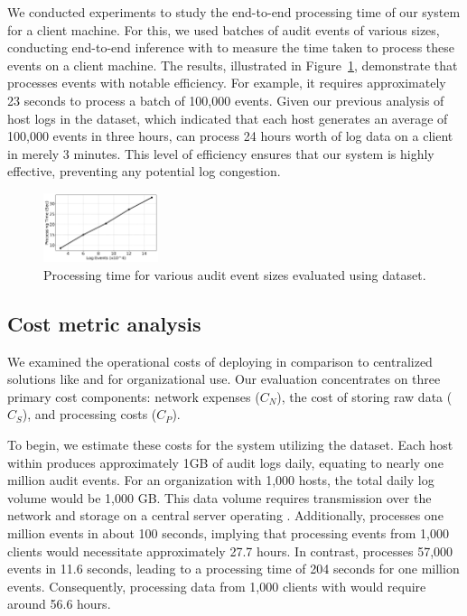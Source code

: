  We conducted experiments to study the end-to-end processing time of our system for a client machine. For this, we used batches of audit events of various sizes, conducting end-to-end inference with \Sys to measure the time taken to process these events on a client machine. The results, illustrated in Figure~\ref{sizevstime}, demonstrate that \Sys processes events with notable efficiency. For example, it requires approximately 23 seconds to process a batch of 100,000 events. Given our previous analysis of host logs in the \optc dataset, which indicated that each host generates an average of 100,000 events in three hours, \Sys can process 24 hours worth of log data on a client in merely 3 minutes. This level of efficiency ensures that our system is highly effective, preventing any potential log congestion.

 \begin{figure}[!t]
  \centering
  \includegraphics[width=0.3\textwidth]{fig/sizevstime.pdf}
  \caption{Processing time for various audit event sizes evaluated using \optc dataset.}
  \label{sizevstime}
  \vspace{-2ex}
\end{figure}

\subsection{Cost metric analysis}
\label{cost_metric}
We examined the operational costs of deploying \Sys in comparison to centralized solutions like \flash and \kairos for organizational use. Our evaluation concentrates on three primary cost components: network expenses (\(C_{N}\)), the cost of storing raw data (\(C_{S}\)), and processing costs (\(C_{P}\)).

To begin, we estimate these costs for the \flash system utilizing the \optc dataset. Each host within \optc produces approximately 1GB of audit logs daily, equating to nearly one million audit events. For an organization with 1,000 hosts, the total daily log volume would be 1,000 GB. This data volume requires transmission over the network and storage on a central server operating \flash. Additionally, \flash processes one million events in about 100 seconds, implying that processing events from 1,000 clients would necessitate approximately 27.7 hours. In contrast, \kairos processes 57,000 events in 11.6 seconds, leading to a processing time of 204 seconds for one million events. Consequently, processing data from 1,000 clients with \kairos would require around 56.6 hours.

